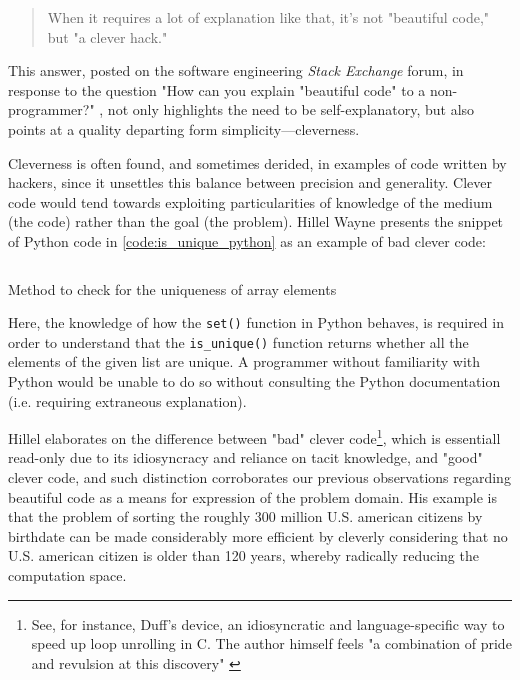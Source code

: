 \begin{quote}
  When it requires a lot of explanation like that, it's not "beautiful code," but "a clever hack." \citep{stackoverflow_how_2013}
\end{quote}

This answer, posted on the software engineering \emph{Stack Exchange} forum, in response to the question "How can you explain "beautiful code" to a non-programmer?" \citep{stackoverflow_how_2013}, not only highlights the need to be self-explanatory, but also points at a quality departing form simplicity—cleverness.

Cleverness is often found, and sometimes derided, in examples of code written by hackers, since it unsettles this balance between precision and generality. Clever code would tend towards exploiting particularities of knowledge of the medium (the code) rather than the goal (the problem). Hillel Wayne presents the snippet of Python code in \ref{code:is_unique_python} as an example of bad clever code:

\begin{listing}
  \inputminted{python}{./corpus/unique.py}
  \caption{Method to check for the uniqueness of array elements}
  \label{code:is_unique_python}
\end{listing}

Here, the knowledge of how the \lstinline{set()} function in Python behaves, is required in order to understand that the \lstinline{is_unique()} function returns whether all the elements of the given list are unique. A programmer without familiarity with Python would be unable to do so without consulting the Python documentation (i.e. requiring extraneous explanation).

Hillel elaborates on the difference between "bad" clever code\footnote{See, for instance, Duff's device, an idiosyncratic and language-specific way to speed up loop unrolling in C. The author himself feels "a combination of pride and revulsion at this discovery" \citep{duff_tom_1983}}, which is essentiall read-only due to its idiosyncracy and reliance on tacit knowledge, and "good" clever code, and such distinction corroborates our previous observations regarding beautiful code as a means for expression of the problem domain. His example is that the problem of sorting the roughly 300 million U.S. american citizens by birthdate can be made considerably more efficient by cleverly considering that no U.S. american citizen is older than 120 years, whereby radically reducing the computation space.

